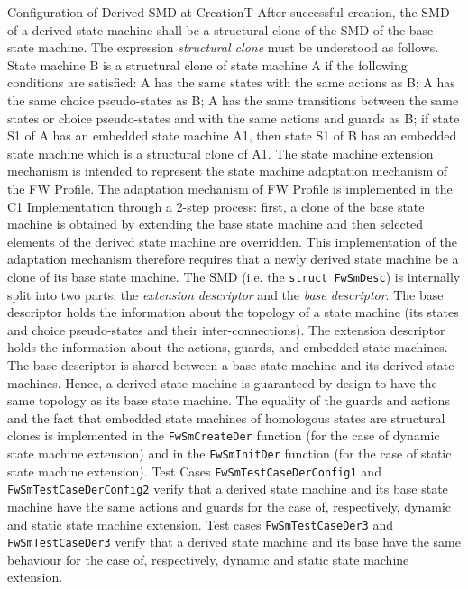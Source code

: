 \documentclass[requirements]{../fwprofile}
\begin{document}
\begin{fw_req_note}{Configuration of Derived SMD at Creation}{T}
{After successful creation, the SMD of a derived state machine shall 
be a structural clone of the SMD of the base state machine.}
{The expression \emph{structural clone} must be understood as follows. 
State machine B is a structural clone of state machine A if the following conditions are 
satisfied: A has the same states with the same actions as B; A has the same choice 
pseudo-states as B; A has the same transitions between the same states or choice 
pseudo-states and with the same actions and guards as B; if state S1 of A has an embedded 
state machine A1, then state S1 of B has an embedded state machine which is a structural 
clone of A1.}
{The state machine extension mechanism is intended to represent 
the state machine adaptation mechanism of the FW Profile. 
The adaptation mechanism of FW Profile is implemented in the C1 Implementation through a 
2-step process: first, a clone of the base state machine is obtained by extending the 
base state machine and then selected elements of the derived state machine are overridden. 
This implementation of the adaptation mechanism therefore requires that a newly derived 
state machine be a clone of its base state machine.}
{The SMD (i.e. the \texttt{struct FwSmDesc}) is internally split 
into two parts: the \emph{extension descriptor} and the \emph{base descriptor}. 
The base descriptor holds the information about the topology of a state machine (its states 
and choice pseudo-states and their inter-connections). 
The extension descriptor holds the information about the actions, guards, and embedded 
state machines. 
The base descriptor is shared between a base state machine and its derived state machines. 
Hence, a derived state machine is guaranteed by design to have the same topology as its 
base state machine. 
The equality of the guards and actions and the fact that embedded state machines of 
homologous states are structural clones is implemented in the \texttt{FwSmCreateDer} 
function (for the case of dynamic state machine extension) and in the \texttt{FwSmInitDer} 
function (for the case of static state machine extension).} 
{Test Cases \texttt{FwSmTestCaseDerConfig1} and \texttt{FwSmTestCaseDerConfig2} verify that a derived state machine and its base state machine have the same actions and guards for the case of, respectively, dynamic and static state machine extension. Test cases \texttt{FwSmTestCaseDer3} and \texttt{FwSmTestCaseDer3} verify that a derived state machine and its base have the same behaviour for the case of, respectively, dynamic and static state machine extension.}
\end{fw_req_note}
\end{document}
